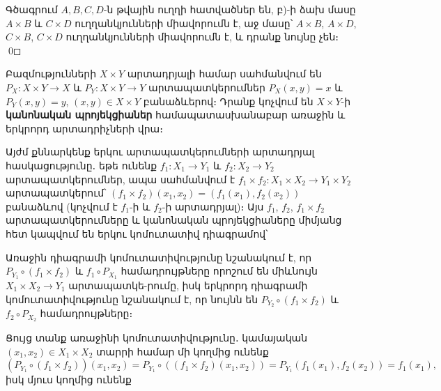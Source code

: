 \documentclass[./main.tex]{subfiles}
\begin{document}
\par Գծագրում $A, B, C, D$-ն թվային ուղղի հատվածներ են, բ)-ի ձախ մասը $A\times B$ և $C\times D$ ուղղանկյունների միա\-վո\-րումն է, աջ մասը՝ $A\times B$, $A \times D$, $C \times B$, $C \times D$ ուղղանկյունների միավորումն է, և դրանք նույնը չեն։ \qed
\par Բազմությունների $X\times Y$ արտադրյալի համար սահմանվում են $P_X:X \times Y \rightarrow X$ և $P_Y:X\times Y\rightarrow Y$ արտապատկերումներ $P_X(x,y)=x$ և ${P_Y(x,y)=y}$, $(x,y) \in X\times Y$ բանաձևերով։ Դրանք կոչվում են  $X \times Y$-ի \textbf{կանոնական պրոյեկցիա\-ներ} համապատասխանաբար առաջին և երկրորդ արտադրիչների վրա։
\par Այժմ քննարկենք երկու $\textbf{արտապատկերումների արտադրյալ}$ հասկացությունը․ եթե ունենք $f_1:X_1 \rightarrow Y_1$ և $f_2:X_2 \rightarrow Y_2$ արտապատկերումներ, ապա սահմանվում է $f_1\times f_2:X_1\times X_2\rightarrow Y_1\times Y_2$ արտապատկերում՝ $(f_1\times f_2)(x_1,x_2)=(f_1(x_1),f_2(x_2))$ բանաձևով (կոչվում է $f_1$-ի և $f_2$-ի արտադրյալ)։ Այս $f_1$, $f_2$, $f_1 \times f_2$ արտա\-պատ\-կե\-րում\-ները և կանոնական պրոյեկցիաները միմյանց հետ կապվում են երկու կոմուտատիվ դիագրամով՝
\begin{center}
\qquad
{}
\end{center}
\par Առաջին դիագրամի կոմուտատիվությունը նշանակում է, որ $P_{Y_1}\circ(f_1\times f_2)$ և ${f_1\circ P_{X_1}}$ համադրույթները որոշում են միևնույն $X_1\times X_2\rightarrow Y_1$ արտապատկե-\linebreak րումը, իսկ երկրորդ դիագրամի կոմուտատիվությունը նշանակում է, որ նույնն են $P_{Y_2}\circ {(f_1 \times f_2)}$ և $f_2\circ P_{X_2}$ համադրույթները։
\par Ցույց տանք առաջինի կոմուտատիվությունը․ կա\-մա\-յա\-կան $(x_1,x_2)\in X_1\times X_2$ տարրի համար մի կողմից ունենք
\[(P_{Y_1}\circ (f_1 \times f_2))(x_1,x_2)=P_{Y_1}\circ ((f_1 \times f_2)(x_1,x_2))=P_{Y_1}(f_1(x_1),f_2(x_2))=f_1(x_1),\] իսկ մյուս կողմից ունենք
\end{document}
